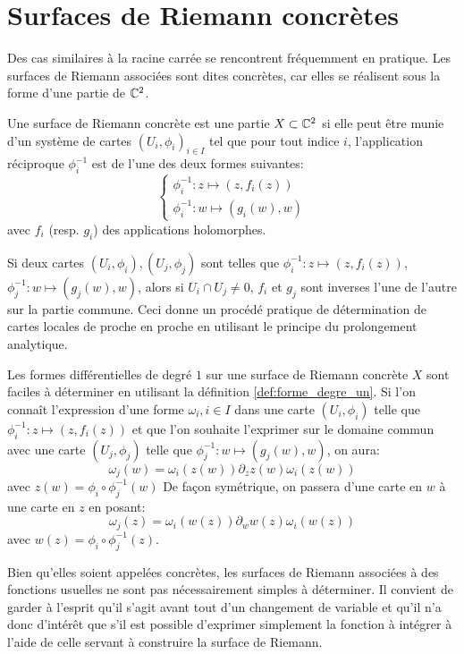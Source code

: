 \section{Surfaces de Riemann concrètes}
Des cas similaires à la racine carrée se rencontrent fréquemment en pratique. Les surfaces de Riemann associées sont dites concrètes, car elles se réalisent sous la forme d'une partie de $\mathbb{C}^2$. 
\begin{defn}
Une surface de Riemann concrète est une partie $X \subset \mathbb{C}^2$ si elle peut être munie d'un système de cartes $(U_i,\phi_i)_{i \in I}$ tel que pour tout indice $i$, l'application réciproque $\phi_i^{-1}$ est de l'une des deux formes suivantes:
\[
\begin{cases}
\phi_i^{-1} \colon z \mapsto (z,f_i(z)) \\
\phi_i^{-1} \colon w \mapsto (g_i(w),w)
\end{cases}
\]
avec $f_i$ (resp. $g_i$) des applications holomorphes.
\end{defn}
Si deux cartes $(U_i,\phi_i),(U_j,\phi_j)$ sont telles que $\phi_i^{-1} \colon z \mapsto (z,f_i(z))$, $\phi_j^{-1} \colon w \mapsto (g_j(w),w)$, alors si $U_i \cap U_j \neq 0$, $f_i$ et $g_j$ sont inverses l'une de l'autre sur la partie commune. Ceci donne un procédé pratique de détermination de cartes locales de proche en proche en utilisant le principe du prolongement analytique. 

Les formes différentielles de degré $1$ sur une surface de Riemann concrète $X$ sont faciles à déterminer en utilisant la définition \ref{def:forme_degre_un}. Si l'on connaît l'expression d'une forme $\omega_i, i \in I$ dans une carte $(U_i,\phi_i)$ telle que $\phi_i^{-1} \colon z \mapsto (z,f_i(z))$ et que l'on souhaite l'exprimer sur le domaine commun avec une carte $(U_j,\phi_j)$ telle que $\phi_j^{-1} \colon w \mapsto (g_j(w),w)$, on aura:
\[
\omega_j(w) = \omega_i(z(w)) \partial_z z(w) \omega_i(z(w))
\]
avec $z(w) = \phi_i \circ \phi_j^{-1}(w)$
De façon symétrique, on passera d'une carte en $w$ à une carte en $z$ en posant:
\[
\omega_j(z) = \omega_i(w(z)) \partial_w w(z) \omega_i(w(z))
\]
avec $w(z) = \phi_i \circ \phi_j^{-1}(z)$.
\begin{rem}
Bien qu'elles soient appelées concrètes, les surfaces de Riemann associées à des fonctions usuelles ne sont pas nécessairement simples à déterminer. Il convient de garder à l'esprit qu'il s'agit avant tout d'un changement de variable et qu'il n'a donc d'intérêt que s'il est possible d'exprimer simplement la fonction à intégrer à l'aide de celle servant à construire la surface de Riemann.
\end{rem}

